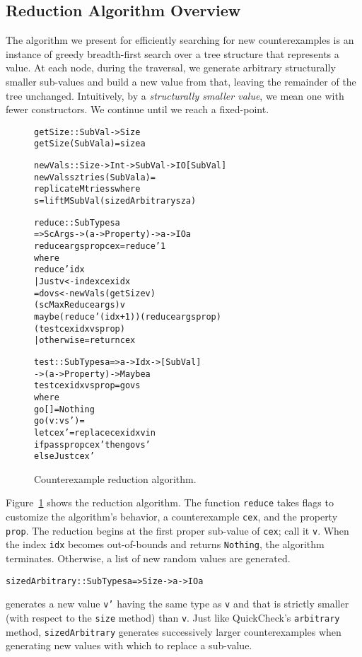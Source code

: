 \documentclass{sigplanconf}
\newenvironment{code}{\begin{alltt}}{\end{alltt}}
\newcommand{\ttp}[1]{\texttt{#1}}
\begin{document}
\subsection{Reduction Algorithm Overview}\label{sec:reduct}
The algorithm we present for efficiently searching for new counterexamples is an
instance of greedy breadth-first search over a tree structure that represents a
value.  At each node, during the traversal, we generate arbitrary
structurally smaller sub-values and build a new value from that, leaving
the remainder of the tree unchanged.  Intuitively, by a \emph{structurally
  smaller value}, we mean one with fewer constructors.  We continue until we
reach a fixed-point.


\begin{figure}[ht]
  \begin{code}
getSize :: SubVal -> Size
getSize (SubVal a) = size a

newVals :: Size -> Int -> SubVal -> IO [SubVal]
newVals sz tries (SubVal a) =
  replicateM tries s where
  s = liftM SubVal (sizedArbitrary sz a)

reduce :: SubTypes a
  => ScArgs -> (a -> Property) -> a -> IO a
reduce args prop cex = reduce' 1
  where
  reduce' idx
    | Just v <- index cex idx
    = do vs <- newVals (getSize v)
                 (scMaxReduce args) v
         maybe (reduce' (idx+1)) (reduce args prop)
               (test cex idx vs prop)
    | otherwise = return cex

test :: SubTypes a => a -> Idx -> [SubVal]
     -> (a -> Property) -> Maybe a
test cex idx vs prop = go vs
  where
  go []      = Nothing
  go (v:vs') =
    let cex' = replace cex idx v in
    if pass prop cex' then go vs'
      else Just cex'
  \end{code}
  \caption{Counterexample reduction algorithm.\label{fig:reduction}}
\end{figure}

Figure~\ref{fig:reduction} shows the reduction algorithm.  The function
\ttp{reduce} takes flags to customize the algorithm's behavior, a counterexample
\ttp{cex}, and the property \ttp{prop}.  The reduction begins at the first
proper sub-value of \ttp{cex}; call it \ttp{v}.  When the index \ttp{idx}
becomes out-of-bounds and returns \ttp{Nothing}, the algorithm terminates.
Otherwise, a list of new random values are generated.
%
\begin{code}
sizedArbitrary :: SubTypes a => Size -> a -> IO a
\end{code}
%
\noindent
generates a new value \ttp{v'} having the same type as \ttp{v} and that is
strictly smaller (with respect to the \ttp{size} method) than \ttp{v}.  Just
like QuickCheck's \ttp{arbitrary} method, \ttp{sizedArbitrary} generates
successively larger counterexamples when generating new values with which to
replace a sub-value.
\end{document}
